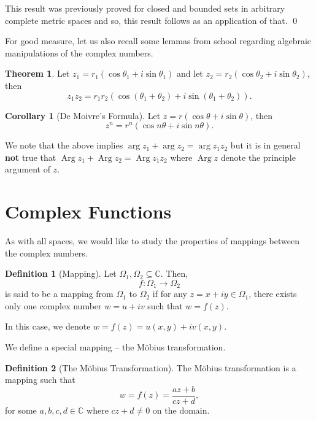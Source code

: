 \documentclass[
]{article}
\theoremstyle{definition}
\newtheorem{theorem}{Theorem}
\newtheorem{corollary}{Corollary}[theorem]
\theoremstyle{definition}
\newtheorem{definition}{Definition}[section]
\begin{document}
This result was previously proved for closed and bounded sets in
arbitrary complete metric spaces and so, this result follows as an
application of that. \qed

For good measure, let us also recall some lemmas from school regarding
algebraic manipulations of the complex numbers.

\begin{theorem}
  Let \(z_1 = r_1(\cos \theta_1 + i\sin \theta_1)\) and let 
  \(z_2 = r_2(\cos \theta_2 + i\sin \theta_2)\), then
  \[z_1 z_2 = r_1 r_2(\cos(\theta_1 + \theta_2) + i\sin(\theta_1 + \theta_2)).\]
\end{theorem}

\begin{corollary}[De Moivre's Formula]
  Let \(z = r(\cos \theta + i\sin \theta)\), then 
  \[z^n = r^n(\cos n\theta + i\sin n\theta).\]
\end{corollary}

We note that the above implies \(\arg z_1 + \arg z_2 = \arg z_1 z_2\)
but it is in general \textbf{not} true that
\(\mathop{\mathrm{Arg}}z_1 + \mathop{\mathrm{Arg}}z_2 = \mathop{\mathrm{Arg}}z_1 z_2\)
where \(\mathop{\mathrm{Arg}}z\) denote the principle argument of \(z\).

\newpage

\hypertarget{complex-functions}{%
\section{Complex Functions}\label{complex-functions}}

As with all spaces, we would like to study the properties of mappings
between the complex numbers.

\begin{definition}[Mapping]
  Let \(\Omega_1, \Omega_2 \subseteq \mathbb{C}\). Then, 
  \[f : \Omega_1 \to \Omega_2\]
  is said to be a mapping from \(\Omega_1\) to \(\Omega_2\) if for any 
  \(z = x + iy \in \Omega_1\), there exists only one complex number 
  \(w = u + iv\) such that \(w = f(z)\).

  In this case, we denote \(w = f(z) = u(x, y) + iv(x, y)\).
\end{definition}

We define a special mapping -- the Möbius transformation.

\begin{definition}[The Möbius Transformation]
  The Möbius transformation is a mapping such that 
  \[w = f(z) = \frac{az + b}{cz + d},\]
  for some \(a, b, c, d \in \mathbb{C}\) where \(cz + d \neq 0\) on the domain.
\end{definition}
\end{document}
